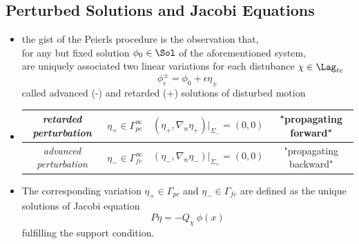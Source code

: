 \documentclass[a4paper,11pt]{scrartcl}
\begin{document}
    \subsection{Perturbed Solutions and Jacobi Equations}
    \begin{itemize}
        \item the gist of the Peierls procedure is the observation that, \\
        for any but fixed  solution $\phi_0\in\Sol$ of the aforementioned system,\\
        are uniquely associated two linear variations for each distubance $\chi \in \Lag_{tc}$
        $$ \phi^\pm_\epsilon = \phi_0 + \epsilon \eta_\pm $$
        called advanced (-) and retarded (+)  solutions of disturbed motion \\
        \item
        \begin{tabular}{|c|c|c|c|}
               \hline
               \emph{retarded perturbation} & $\eta_+ \in \Gamma^\infty_{pc}$ & $(\eta_+, \nabla_n \eta_+ ) \big \vert_{\Sigma_{-}} = (0,0)$ & "propagating forward" \\
               \hline
               \emph{advanced perturbation} &$\eta_- \in \Gamma^\infty_{fc}$ & $(\eta_-, \nabla_n \eta_- ) \big \vert_{\Sigma_{+}} = (0,0)$ & "propagating backward" \\
               \hline
           \end{tabular}
           \item The corresponding variation $\eta_+ \in \Gamma_{pc}$ and $\eta_- \in \Gamma_{fc}$ are defined as the unique solutions of Jacobi equation
           $$ P \eta = -Q_\chi \: \phi(x) $$
           fulfilling the support condition.
       \end{itemize}
\end{document}
